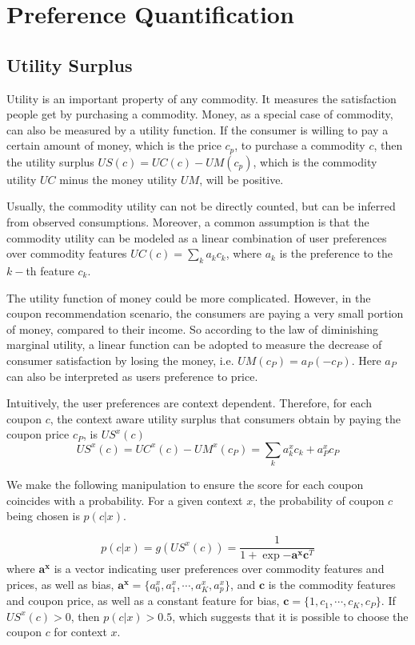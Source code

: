 \documentclass[preprint,12pt]{elsarticle}
\begin{document}
\section{Preference Quantification}\label{sec:util}
\subsection{Utility Surplus}
Utility is an important property of any commodity. It measures the satisfaction people get by purchasing a commodity. Money, as a special case of commodity, can also be measured by a utility function. If the consumer is willing to pay a certain amount of money, which is the price $c_p$, to purchase a commodity $c$, then the utility surplus $US(c)=UC(c)-UM(c_p)$, which is the commodity utility $UC$ minus the money utility $UM$, will be positive.

Usually, the commodity utility can not be directly counted, but can be inferred from observed consumptions. Moreover, a common assumption is that the commodity utility can be modeled as a linear combination of user preferences over commodity features $UC(c)=\sum_k a_k c_k$, where $a_k$ is the preference to the $k-$th feature $c_k$.

The utility function of money could be more complicated. However, in the coupon recommendation scenario, the consumers are paying a very small portion of money, compared to their income. So according to the law of diminishing marginal utility, a linear function can be adopted to measure the decrease of consumer satisfaction by losing the money, i.e. $UM(c_P)=a_P (-c_P)$. Here $a_P$ can also be interpreted as users preference to price.

Intuitively, the user preferences are context dependent. Therefore, for each coupon $c$, the context aware utility surplus that consumers obtain by paying the coupon price $c_P$, is $US^x(c)$
\begin{equation}\label{equ:us}
  US^x(c)=UC^x(c)-UM^x(c_P)=\sum_k a_k^xc_k + a_P^xc_P
\end{equation}

We make the following manipulation to ensure the score for each coupon coincides with a probability. For a given context $x$, the probability of coupon $c$ being chosen is $p(c|x)$.

\begin{equation}\label{equ:pcx}
  p(c|x)=g(US^x(c))=\frac{1}{1+\exp{-\mathbf{a^x}\mathbf{c}^T}}
\end{equation}
where $\mathbf{a^x}$ is a vector indicating user preferences over commodity features and prices, as well as bias, $\mathbf{a^x}=\{a_0^x,a_1^x,\cdots,a_K^x,a_p^x\}$, and $\mathbf{c}$ is the commodity features and coupon price, as well as a constant feature for bias, $\mathbf{c}=\{1,c_1,\cdots,c_K,c_P\}$. If $US^x(c)>0$, then $p(c|x)>0.5$, which suggests that it is possible to choose the coupon $c$ for context $x$.
\end{document}
